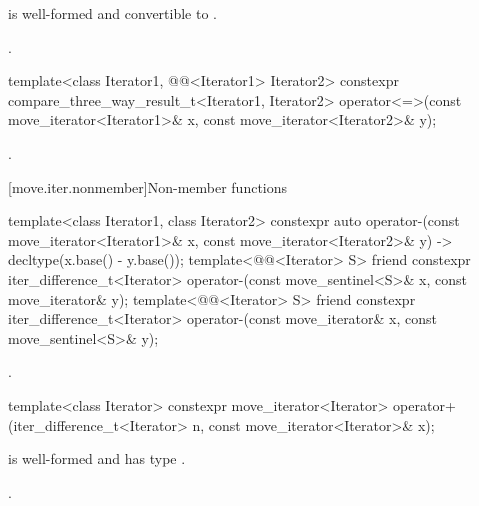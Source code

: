 \begin{itemdescr}
\pnum
\constraints
{} is well-formed and
convertible to .

\pnum
\returns
{}.
\end{itemdescr}

%
\begin{itemdecl}
template<class Iterator1, @@<Iterator1> Iterator2>
  constexpr compare_three_way_result_t<Iterator1, Iterator2>
    operator<=>(const move_iterator<Iterator1>& x,
                const move_iterator<Iterator2>& y);
\end{itemdecl}

\begin{itemdescr}
\pnum
\returns
{}.
\end{itemdescr}

[move.iter.nonmember]{Non-member functions}

%
\begin{itemdecl}
template<class Iterator1, class Iterator2>
  constexpr auto operator-(const move_iterator<Iterator1>& x,
                           const move_iterator<Iterator2>& y)
    -> decltype(x.base() - y.base());
template<@@<Iterator> S>
  friend constexpr iter_difference_t<Iterator>
    operator-(const move_sentinel<S>& x, const move_iterator& y);
template<@@<Iterator> S>
  friend constexpr iter_difference_t<Iterator>
    operator-(const move_iterator& x, const move_sentinel<S>& y);
\end{itemdecl}

\begin{itemdescr}
\pnum
\returns
{}.
\end{itemdescr}

%
\begin{itemdecl}
template<class Iterator>
  constexpr move_iterator<Iterator>
    operator+(iter_difference_t<Iterator> n, const move_iterator<Iterator>& x);
\end{itemdecl}

\begin{itemdescr}
\pnum
\constraints
{} is well-formed and has type .

\pnum
\returns
{}.
\end{itemdescr}

